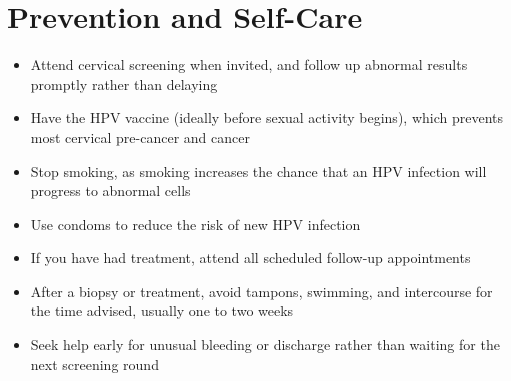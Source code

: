 \section*{Prevention and Self-Care}
\begin{itemize}
    \item Attend cervical screening when invited, and follow up abnormal results promptly rather than delaying
    \item Have the HPV vaccine (ideally before sexual activity begins), which prevents most cervical pre-cancer and cancer
    \item Stop smoking, as smoking increases the chance that an HPV infection will progress to abnormal cells
    \item Use condoms to reduce the risk of new HPV infection
    \item If you have had treatment, attend all scheduled follow-up appointments
    \item After a biopsy or treatment, avoid tampons, swimming, and intercourse for the time advised, usually one to two weeks
    \item Seek help early for unusual bleeding or discharge rather than waiting for the next screening round
\end{itemize}
